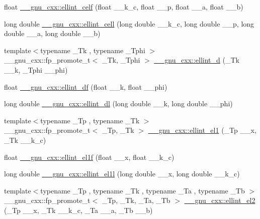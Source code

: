 \begin{DoxyCompactItemize}
\item 
float \hyperlink{group__mathsf__gnu_ga6d8fbef7853cf37de11278b1ff7127e8}{\+\_\+\+\_\+gnu\+\_\+cxx\+::ellint\+\_\+celf} (float \+\_\+\+\_\+k\+\_\+c, float \+\_\+\+\_\+p, float \+\_\+\+\_\+a, float \+\_\+\+\_\+b)
\item 
long double \hyperlink{group__mathsf__gnu_gaa5add699fb2b4b02e63f8725a3a79750}{\+\_\+\+\_\+gnu\+\_\+cxx\+::ellint\+\_\+cell} (long double \+\_\+\+\_\+k\+\_\+c, long double \+\_\+\+\_\+p, long double \+\_\+\+\_\+a, long double \+\_\+\+\_\+b)
\item 
{\footnotesize template$<$typename \+\_\+\+Tk , typename \+\_\+\+Tphi $>$ }\\\+\_\+\+\_\+gnu\+\_\+cxx\+::fp\+\_\+promote\+\_\+t$<$ \+\_\+\+Tk, \+\_\+\+Tphi $>$ \hyperlink{group__mathsf__gnu_gad75103894786e6d7766bac4d8447b6cc}{\+\_\+\+\_\+gnu\+\_\+cxx\+::ellint\+\_\+d} (\+\_\+\+Tk \+\_\+\+\_\+k, \+\_\+\+Tphi \+\_\+\+\_\+phi)
\item 
float \hyperlink{group__mathsf__gnu_ga02ed50be21fdd84ad6bed003f94a9e69}{\+\_\+\+\_\+gnu\+\_\+cxx\+::ellint\+\_\+df} (float \+\_\+\+\_\+k, float \+\_\+\+\_\+phi)
\item 
long double \hyperlink{group__mathsf__gnu_gaa34bcb8e316f2e8b2b2bf48cd89abd98}{\+\_\+\+\_\+gnu\+\_\+cxx\+::ellint\+\_\+dl} (long double \+\_\+\+\_\+k, long double \+\_\+\+\_\+phi)
\item 
{\footnotesize template$<$typename \+\_\+\+Tp , typename \+\_\+\+Tk $>$ }\\\+\_\+\+\_\+gnu\+\_\+cxx\+::fp\+\_\+promote\+\_\+t$<$ \+\_\+\+Tp, \+\_\+\+Tk $>$ \hyperlink{group__mathsf__gnu_ga510b1e51e7d3bc937ed1b4c2f57492e4}{\+\_\+\+\_\+gnu\+\_\+cxx\+::ellint\+\_\+el1} (\+\_\+\+Tp \+\_\+\+\_\+x, \+\_\+\+Tk \+\_\+\+\_\+k\+\_\+c)
\item 
float \hyperlink{group__mathsf__gnu_ga8d8342bb4f42c7fe09b5589c54d4e713}{\+\_\+\+\_\+gnu\+\_\+cxx\+::ellint\+\_\+el1f} (float \+\_\+\+\_\+x, float \+\_\+\+\_\+k\+\_\+c)
\item 
long double \hyperlink{group__mathsf__gnu_gaeed1201e421be410460739048cba5cd8}{\+\_\+\+\_\+gnu\+\_\+cxx\+::ellint\+\_\+el1l} (long double \+\_\+\+\_\+x, long double \+\_\+\+\_\+k\+\_\+c)
\item 
{\footnotesize template$<$typename \+\_\+\+Tp , typename \+\_\+\+Tk , typename \+\_\+\+Ta , typename \+\_\+\+Tb $>$ }\\\+\_\+\+\_\+gnu\+\_\+cxx\+::fp\+\_\+promote\+\_\+t$<$ \+\_\+\+Tp, \+\_\+\+Tk, \+\_\+\+Ta, \+\_\+\+Tb $>$ \hyperlink{group__mathsf__gnu_ga6230131ce5679e0936a16a6b029d6342}{\+\_\+\+\_\+gnu\+\_\+cxx\+::ellint\+\_\+el2} (\+\_\+\+Tp \+\_\+\+\_\+x, \+\_\+\+Tk \+\_\+\+\_\+k\+\_\+c, \+\_\+\+Ta \+\_\+\+\_\+a, \+\_\+\+Tb \+\_\+\+\_\+b)

\end{DoxyCompactItemize}
